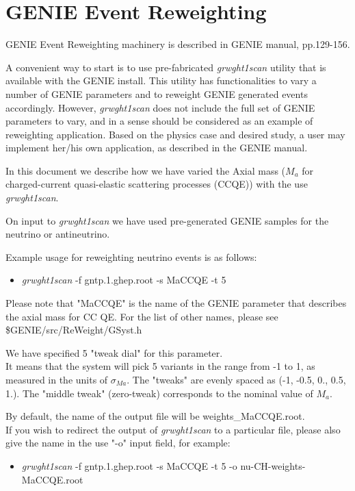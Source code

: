 \section{GENIE Event Reweighting}

GENIE Event Reweighting machinery is described in GENIE manual\cite{geniemanual}, pp.129-156.

A convenient way to start is to use pre-fabricated {\it grwght1scan} utility that is available with 
the GENIE install. This utility has functionalities to vary a number of GENIE parameters and to reweight
GENIE generated events accordingly.
However, {\it grwght1scan} does not include the full set of GENIE parameters to vary, and in a sense
should be considered as an example of reweighting application.
Based on the physics case and desired study, a user may implement her/his own application, as described 
in the GENIE manual\cite{geniemanual}.

In this document we describe how we have varied the Axial mass ($M_{a}$ for charged-current quasi-elastic 
scattering processes (CCQE)) with the use {\it grwght1scan}.

On input to {\it grwght1scan} we have used pre-generated GENIE samples for the neutrino or antineutrino.

Example usage for reweighting neutrino events is as follows:
\begin{itemize}
\item { {\it grwght1scan } -f gntp.1.ghep.root -s MaCCQE -t 5}
\end{itemize}

Please note that "MaCCQE" is the name of the GENIE parameter that describes the axial mass for CC QE.
For the list of other names, please see \$GENIE/src/ReWeight/GSyst.h 

We have specified 5 "tweak dial" for this parameter. \\
It means that the system will pick 5 variants in the range from -1 to 1, as measured in the units of $\sigma_{Ma}$. 
The "tweaks" are evenly spaced as (-1, -0.5, 0., 0.5, 1.).
The "middle tweak" (zero-tweak) corresponds to the nominal value of $M_{a}$.

By default, the name of the output file will be weights\_MaCCQE.root. \\
If you wish to redirect the output of {\it grwght1scan} to a particular file, please also give the name
in the use "-o" input field, for example:
\begin{itemize}
\item { {\it grwght1scan } -f gntp.1.ghep.root -s MaCCQE -t 5 -o nu-CH-weights-MaCCQE.root }
\end{itemize}
 
